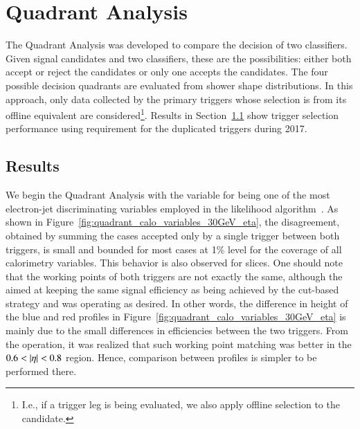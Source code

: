 \section{Quadrant Analysis}\label{ssec:quadrant}

The Quadrant Analysis was developed to compare the decision of two classifiers. Given signal candidates and two classifiers, these are the possibilities: either both accept or reject the candidates or only one accepts the candidates. The four possible decision quadrants are evaluated from shower shape distributions.
In this approach, only data collected by the primary triggers whose selection is from its offline equivalent are considered\footnote{I.e., if a \tight{} trigger leg is being evaluated, we also apply \tight{} offline selection to the candidate.}.
Results in Section~\ref{top:quadrant_results} show
trigger selection performance using \tight{} requirement for the duplicated triggers during 2017.

\subsection{Results}\label{top:quadrant_results}



We begin the Quadrant Analysis with the variable \reta{} for being one of the
most electron-jet discriminating variables employed in the likelihood
algorithm~\cite{aaboud2019electron}. As shown in Figure~\ref{fig:quadrant_calo_variables_30GeV_eta}, the disagreement, obtained by summing the cases accepted only by a single trigger between both triggers, is small and bounded for most cases at 1\% level for the coverage of all calorimetry variables. 
This behavior is also observed for \et{} slices. 
One should note that the working points of both triggers are not  exactly the same, although the \rnn{} aimed at keeping the same signal efficiency as being achieved by the cut-based strategy and was operating as desired.  
In other words, 
the difference in height of the blue and red profiles in Figure~\ref{fig:quadrant_calo_variables_30GeV_eta} is mainly due to the small differences in efficiencies between the two triggers.
From the operation, it was realized that such working point matching was better in the $0.6<\abseta{}<0.8$ region. Hence, comparison between profiles is simpler to be performed there.

